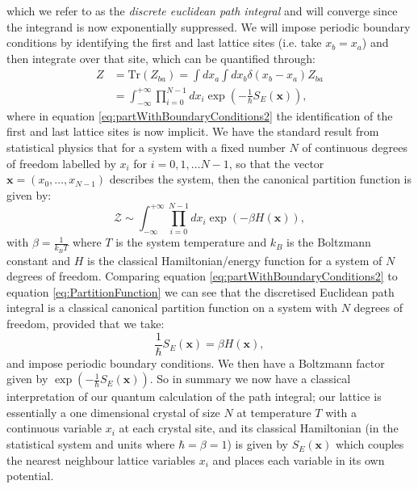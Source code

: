 \documentclass[12pt]{article}
\begin{document}
        which we refer to as the \textit{discrete euclidean path integral} and will converge since the integrand is now exponentially suppressed. We will impose periodic boundary conditions by identifying the first and last lattice sites (i.e. take $x_b=x_a$) and then integrate over that site, which can be quantified through: 
        \begin{align}
            \label{eq:partWithBoundaryConditions1}
            Z & = \text{Tr}\left(Z_{ba}\right) = \int dx_a \int dx_b \delta\left(x_b-x_a\right)Z_{ba} \\
            \label{eq:partWithBoundaryConditions2}
              & = \int^{+\infty}_{-\infty}\prod_{i=0}^{N-1}dx_i \exp{\left(-\frac{1}{\hbar}S_{E}\left(\bm{x}\right)\right)},
        \end{align}
        where in equation \ref{eq:partWithBoundaryConditions2} the identification of the first and last lattice sites is now implicit. We have the standard result from statistical physics that for a system with a fixed number $N$ of continuous degrees of freedom labelled by $x_i$ for $i=0,1,\dots N-1$, so that the vector $\bm{x}=\left(x_0,\dots,x_{N-1}\right)$ describes the system, then the canonical partition function is given by:
        \begin{equation}
            \label{eq:PartitionFunction}
            \mathcal{Z} \sim \int_{-\infty}^{+\infty}\prod_{i=0}^{N-1}dx_{i}\exp{\left(-\beta H\left(\bm{x}\right)\right)},
        \end{equation}
        with $\beta=\frac{1}{k_{B}T}$ where $T$ is the system temperature and $k_{B}$ is the Boltzmann constant and $H$ is the classical Hamiltonian/energy function for a system of $N$ degrees of freedom. Comparing equation \ref{eq:partWithBoundaryConditions2} to equation \ref{eq:PartitionFunction} we can see that the discretised Euclidean path integral is a classical canonical partition function on a system with $N$ degrees of freedom, provided that we take:
        \begin{equation}
            \label{ActionToHamiltonian}
            \frac{1}{\hbar}S_{E}\left(\bm{x}\right) = \beta H\left(\bm{x}\right),
        \end{equation}
        and impose periodic boundary conditions. We then have a Boltzmann factor given by $\exp{\left(-\frac{1}{\hbar}S_{E}\left(\bm{x}\right)\right)}$. So in summary we now have a classical interpretation of our quantum calculation of the path integral; our lattice is essentially a one dimensional crystal of size $N$ at temperature $T$ with a continuous variable $x_i$ at each crystal site, and its classical Hamiltonian (in the statistical system and units where $\hbar=\beta=1$) is given by $S_E\left(\bm{x}\right)$ which couples the nearest neighbour lattice variables $x_i$ and places each variable in its own potential. 
\end{document}
